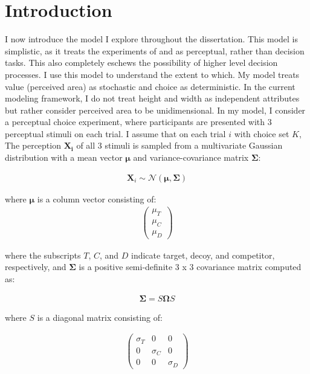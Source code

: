 \section{Introduction}

I now introduce the model I explore throughout the dissertation.  This model is simplistic, as it treats the experiments of \textcite{trueblood2013not} and \textcite{spektorWhenGoodLooks2018b} as perceptual, rather than decision tasks. This also completely eschews the possibility of higher level decision processes. I use this model to understand the extent to which. My model treats value (perceived area) as stochastic and choice as deterministic. In the current modeling framework, I do not treat height and width as independent attributes but rather consider perceived area to be unidimensional. In my model, I consider a perceptual choice experiment, where participants are presented with 3 perceptual stimuli on each trial. I assume that on each trial $i$ with choice set $K$, The perception $\mathbf{X_i}$ of all 3 stimuli is sampled from a multivariate Gaussian distribution with a mean vector $\boldsymbol{\mu}$ and variance-covariance matrix $\boldsymbol{\Sigma}$:

\begin{align}
   \mathbf{X}_{i} \sim \mathcal{N}(\boldsymbol{\mu}, \boldsymbol{\Sigma})
   \label{eqn:mvnorm}
\end{align}

where $\boldsymbol{\mu}$ is a column vector consisting of:
\begin{align}
   \begin{pmatrix}
      \mu_{T} \\
      \mu_{C} \\
      \mu_{D}
      \end{pmatrix}
   \label{eqn:mu}
\end{align}

where the subscripts $T$, $C$, and $D$ indicate target, decoy, and competitor, respectively, and $\boldsymbol{\Sigma}$ is a positive semi-definite 3 x 3 covariance matrix computed as:

\begin{align}
   \boldsymbol{\Sigma}=S\boldsymbol{\Omega}S
   \label{eqn:Sigma}
\end{align}

where $S$ is a diagonal matrix consisting of: 

\begin{align}
   \begin{pmatrix}
      \sigma_{T} & 0 & 0 \\
      0 & \sigma_{C} & 0 \\
      0 & 0 & \sigma_{D} 
   \end{pmatrix}
\label{eqn:S}
\end{align}


